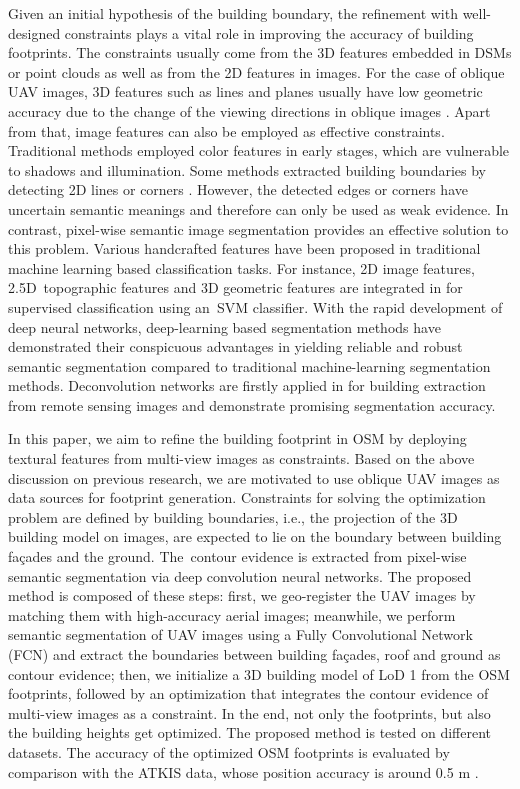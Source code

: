 Given an initial hypothesis of the building boundary, the refinement with well-designed constraints plays a vital role in improving the accuracy of building footprints. The constraints usually come from the 3D features embedded in DSMs 
or point clouds as well as from the 2D features in images. For the case of oblique UAV images, 3D features such as lines \cite{lafarge2012creat} and planes usually have low geometric accuracy due to the change of the viewing directions in oblique images \cite{xiao2015building}. Apart from that, image features can also be employed as effective constraints. Traditional methods employed color features \cite{Sirmacek2008building} in early stages, which are vulnerable to shadows and illumination. Some methods extracted building boundaries by detecting 2D lines \cite{zhu2015feature} or corners \cite{wegner2009fusion}. However, the detected edges or corners have uncertain semantic meanings and therefore can only be used as weak evidence. In contrast, pixel-wise semantic image segmentation provides an effective solution to this problem. Various handcrafted features have been proposed in traditional machine learning based classification tasks. For instance, 2D image features, 2.5D~topographic features and 3D geometric features are integrated in \cite{gevaert2017informal} for supervised classification using an~SVM classifier. With the rapid development of deep neural networks, deep-learning based segmentation methods have demonstrated their conspicuous advantages in yielding reliable and robust semantic segmentation compared to traditional machine-learning segmentation methods. Deconvolution networks are firstly applied in \cite{huang2016building} for building extraction from remote sensing images and demonstrate promising segmentation accuracy.

In this paper, we aim to refine the building footprint in OSM by deploying textural features from multi-view images as constraints. Based on the above discussion on previous research, we are motivated to use oblique UAV images as data sources for footprint generation. Constraints for solving the optimization problem are defined by building boundaries, i.e., the projection of the 3D building model on images, are expected to lie on the boundary between building fa\c{c}ades and the ground. The~contour evidence is extracted from pixel-wise semantic segmentation via deep convolution neural networks. The proposed method is composed of these steps: first, we geo-register the UAV images by matching them with high-accuracy aerial images; meanwhile, we perform semantic segmentation of UAV images using a Fully Convolutional Network (FCN) and extract the boundaries between building fa\c{c}ades, roof and ground as contour evidence; then, we initialize a 3D building model of LoD 1 
from the OSM footprints, followed by an optimization that integrates the contour evidence of multi-view images as a constraint. In the end, not only the footprints, but also the building heights get optimized. The proposed method is tested on different datasets. The accuracy of the optimized OSM footprints is evaluated by comparison with the ATKIS 
data, whose position accuracy is around 0.5 m \cite{muller1998quality}. 


